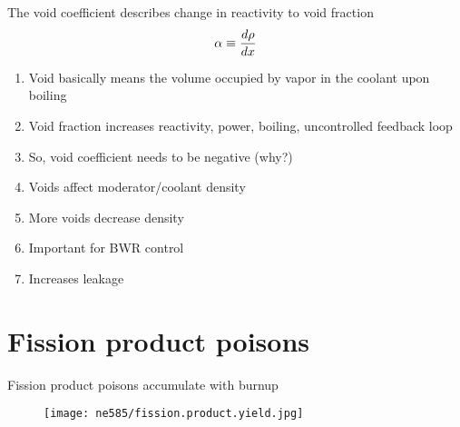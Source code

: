 \documentclass[aspectratio=1610,pdftex,dvipsnames,compress,xcolor={dvipsnames}]{beamer}
\begin{document}
\addtocounter{framenumber}{-1} 
\begin{frame}{The void coefficient describes change in reactivity to void fraction}
    \begin{equation}
        \LARGE
        \alpha \equiv \frac{d\rho}{dx}
    \end{equation}

    \vspace*{\fill}

    \begin{enumerate}[series=outerlist,topsep=0pt,itemsep=15pt,leftmargin=*,label=(\arabic*)]
        \item[]Void basically means the volume occupied by vapor in the coolant upon boiling
        \item[]Void fraction increases reactivity, power, boiling, uncontrolled feedback loop
        \item[]So, void coefficient needs to be negative (why?)
        \item[]Voids affect moderator/coolant density
        \item[]More voids decrease density
        \item[]Important for BWR control
        \item[]Increases leakage
    \end{enumerate}
\end{frame}


\section{Fission product poisons}


\addtocounter{framenumber}{-1} 
\begin{frame}{Fission product poisons accumulate with burnup}
    \begin{figure}
        \centering
        \texttt{[image: ne585/fission.product.yield.jpg]}
    \end{figure}
\end{frame}
\end{document}
